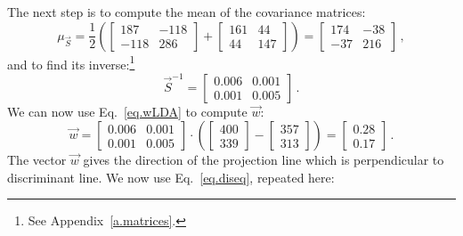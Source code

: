 The next step is to compute the mean of the covariance matrices:
\[
\mu_{\vec{S}} = 
\frac{1}{2}\left(\left[ \begin{array}{c} 187\\-118\end{array} \begin{array}{c} -118\\286 \end{array}\right]+
\left[ \begin{array}{c} 161\\44\end{array} \begin{array}{c} 44\\147 \end{array}\right]\right) = 
\left[ \begin{array}{c} 174\\-37\end{array} \begin{array}{c} -38\\216 \end{array}\right]\,,
\]
and to find its inverse:\footnote{See Appendix~\ref{a.matrices}.}
\[
\vec{S}^{-1} = \left[ \begin{array}{c} 0.006\\0.001\end{array} \begin{array}{c} 0.001\\0.005 \end{array}\right]\,.
\]
We can now use Eq.~\ref{eq.wLDA} to compute $\vec{w}$:
\[
\vec{w} = \left[ \begin{array}{c} 0.006\\0.001\end{array} \begin{array}{c} 0.001\\0.005 \end{array}\right] \cdot \left( \left[ \begin{array}{c} 400\\339 \end{array}\right] - \left[ \begin{array}{c} 357\\313 \end{array} \right] \right) = \left[ \begin{array}{c} 0.28\\0.17 \end{array} \right]\,.
\]
The vector $\vec{w}$ gives the direction of the projection line which is perpendicular to discriminant line. We now use Eq.~\ref{eq.diseq}, repeated here:
